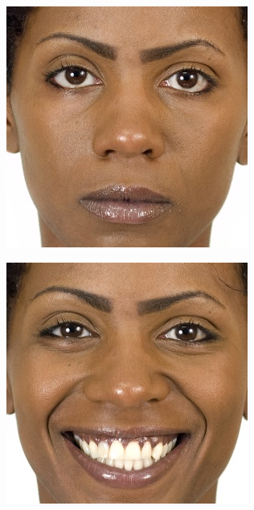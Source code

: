 \begin{figure}[H]
\centering
\begin{subfigure}[b]{.2\linewidth}
\includegraphics[width=\linewidth]{img/CFD1.jpg}
\end{subfigure}
\centering
\begin{subfigure}[b]{.2\linewidth}
\includegraphics[width=\linewidth]{img/CFD2.jpg}

\end{subfigure}
\end{figure}
